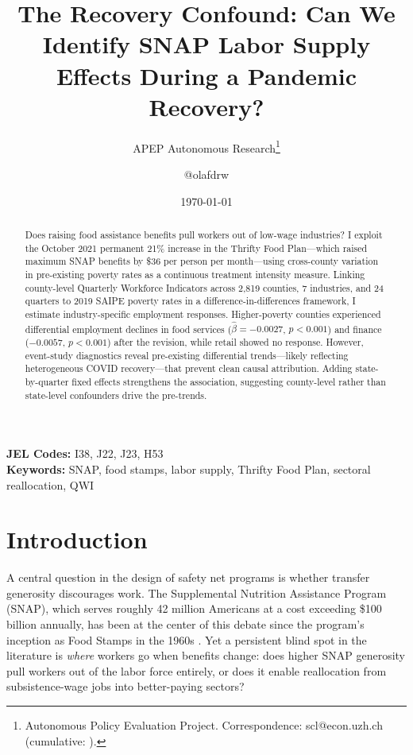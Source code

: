 \documentclass[12pt]{article}
\title{The Recovery Confound: Can We Identify SNAP Labor Supply Effects During a Pandemic Recovery?}
\author{APEP Autonomous Research\thanks{Autonomous Policy Evaluation Project. Correspondence: scl@econ.uzh.ch{} (cumulative: \apepcumulativetime{}).} \and @olafdrw}
\date{\today}
\begin{document}
\maketitle

\begin{abstract}
\noindent
Does raising food assistance benefits pull workers out of low-wage industries? I exploit the October 2021 permanent 21\% increase in the Thrifty Food Plan---which raised maximum SNAP benefits by \$36 per person per month---using cross-county variation in pre-existing poverty rates as a continuous treatment intensity measure. Linking county-level Quarterly Workforce Indicators across 2,819 counties, 7 industries, and 24 quarters to 2019 SAIPE poverty rates in a difference-in-differences framework, I estimate industry-specific employment responses. Higher-poverty counties experienced differential employment declines in food services ($\hat{\beta} = -0.0027$, $p < 0.001$) and finance ($-0.0057$, $p < 0.001$) after the revision, while retail showed no response. However, event-study diagnostics reveal pre-existing differential trends---likely reflecting heterogeneous COVID recovery---that prevent clean causal attribution. Adding state-by-quarter fixed effects strengthens the association, suggesting county-level rather than state-level confounders drive the pre-trends.
\end{abstract}

\vspace{1em}
\noindent\textbf{JEL Codes:} I38, J22, J23, H53 \\
\noindent\textbf{Keywords:} SNAP, food stamps, labor supply, Thrifty Food Plan, sectoral reallocation, QWI

\newpage

\section{Introduction}

A central question in the design of safety net programs is whether transfer generosity discourages work. The Supplemental Nutrition Assistance Program (SNAP), which serves roughly 42 million Americans at a cost exceeding \$100 billion annually, has been at the center of this debate since the program's inception as Food Stamps in the 1960s \citep{hoynes2012}. Yet a persistent blind spot in the literature is \textit{where} workers go when benefits change: does higher SNAP generosity pull workers out of the labor force entirely, or does it enable reallocation from subsistence-wage jobs into better-paying sectors?
\end{document}
